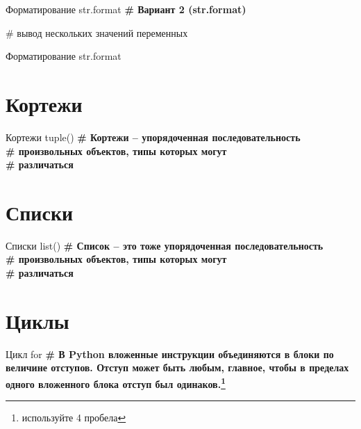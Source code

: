 \documentclass[12pt]{beamer}
\begin{document}
\begin{frame}{Форматирование str.format}
\textbf{\# Вариант 2 (str.format)}

\vspace{0.5cm}
\# вывод нескольких значений переменных

\end{frame}

\begin{frame}{Форматирование str.format}
\vspace{0.5cm}

\end{frame}


\section{Кортежи}
\begin{frame}{Кортежи tuple()}
\textbf{\# Кортежи -- упорядоченная последовательность \\ \# произвольных объектов, типы которых могут \\ \# различаться}
\vspace{0.5cm}

\vspace{0.5cm}
\end{frame}


\section{Списки}
\begin{frame}{Списки list()}
\textbf{\# Список -- это тоже упорядоченная последовательность \\ \# произвольных объектов, типы которых могут \\ \# различаться}
\vspace{0.5cm}

\vspace{0.5cm}
\end{frame}


\section{Циклы}
\begin{frame}{Цикл for}
\textbf{\# В Python вложенные инструкции объединяются в блоки по величине отступов. Отступ может быть любым, главное, чтобы в пределах одного вложенного блока отступ был одинаков.\footnote{используйте 4 пробела} }
\vspace{0.5cm}

\vspace{0.5cm}
\end{frame}
\end{document}
